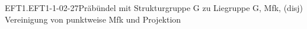 \begin{REM}{EFT1.EFT1-1-02-27}{Präbündel mit Strukturgruppe G zu Liegruppe G, Mfk, (disj) Vereinigung von punktweise Mfk und Projektion}

\end{REM}
